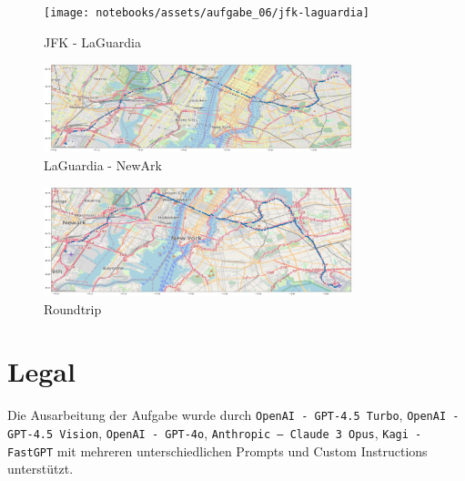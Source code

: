 \documentclass[a4paper,11pt]{report}
\begin{document}
    \begin{figure}[htbp]
        \centering
        \texttt{[image: notebooks/assets/aufgabe\_06/jfk-laguardia]}
        \caption{JFK - LaGuardia}
        \label{fig:jfk-laguardia}
    \end{figure}

    \begin{figure}[htbp]
        \centering
        \includegraphics[width=0.8\textwidth]{notebooks/assets/aufgabe_06/laguardia-newark}
        \caption{LaGuardia - NewArk}
        \label{fig:laguardia-newark}
    \end{figure}

    \begin{figure}[htbp]
        \centering
        \includegraphics[width=0.8\textwidth]{notebooks/assets/aufgabe_06/roundtrip}
        \caption{Roundtrip}
        \label{fig:roundtrip}
    \end{figure}
    \newpage

    \chapter{Legal}
    Die Ausarbeitung der Aufgabe wurde durch \texttt{OpenAI - GPT-4.5 Turbo}, \texttt{OpenAI - GPT-4.5 Vision}, \texttt{OpenAI - GPT-4o}, \texttt{Anthropic -- Claude 3 Opus},  \texttt{Kagi - FastGPT} mit mehreren unterschiedlichen Prompts und Custom Instructions unterstützt.
\end{document}
